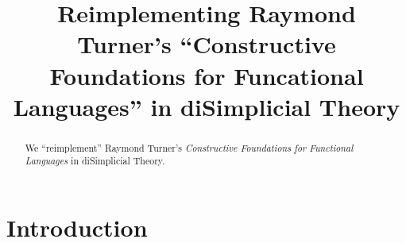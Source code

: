 \documentclass[a4paper,openany]{amsbook}
\begin{document}
\frontmatter
\sloppy

\title[Constructive Foundations]{Reimplementing Raymond Turner's ``Constructive Foundations 
for Funcational Languages'' in diSimplicial Theory}

%

\begin{abstract}
We ``reimplement'' Raymond Turner's \emph{Constructive Foundations for Functional
Languages} in diSimplicial Theory.
\end{abstract} 
\maketitle 
\tableofcontents 
\mainmatter

\section{Introduction}



\end{document}
